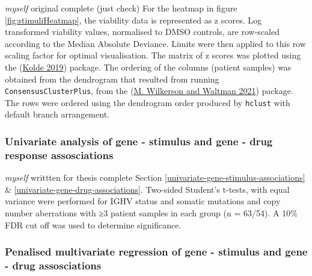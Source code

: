 \documentclass[11pt, a4paper, twosided]{book}
\begin{document}
\emph{myself} original complete (just check)
For the heatmap in figure \ref{fig:stimuliHeatmap}, the viability data is represented as z scores. Log transformed viability values, normalised to DMSO controls, are row-scaled according to the Median Absolute Deviance. Limits were then applied to this row scaling factor for optimal visualisation. The matrix of z scores was plotted using the (\protect\hyperlink{ref-R-pheatmap}{Kolde 2019}) package. The ordering of the columns (patient samples) was obtained from the dendrogram that resulted from running \texttt{ConsensusClusterPlus}, from the (\protect\hyperlink{ref-R-ConsensusClusterPlus}{M. Wilkerson and Waltman 2021}) package. The rows were ordered using the dendrogram order produced by \texttt{hclust} with default branch arrangement.

\hypertarget{univariate-gene-stimulus-associations-method}{%
\subsubsection{Univariate analysis of gene - stimulus and gene - drug response assosciations}\label{univariate-gene-stimulus-associations-method}}

\emph{myself} writtten for thesis complete
Section \ref{univariate-gene-stimulus-associations} \& \ref{univariate-gene-drug-associations}. Two-sided Student's t-tests, with equal variance were performed for IGHV status and somatic mutations and copy number aberrations with ≥3 patient samples in each group (n = 63/54). A 10\% FDR cut off was used to determine significance.

\hypertarget{multivariate-gene-stimulus-assosciations-method}{%
\subsubsection{Penalised multivariate regression of gene - stimulus and gene - drug assosciations}\label{multivariate-gene-stimulus-assosciations-method}}
\end{document}

